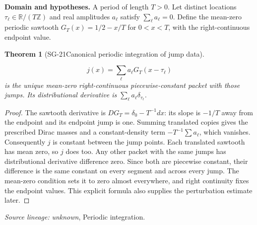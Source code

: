 \documentclass[11pt]{article}
\newtheorem{theorem}{Theorem}[section]
\theoremstyle{definition}\newtheorem{definition}[theorem]{Definition}
\theoremstyle{remark}\newtheorem{remark}[theorem]{Remark}
\begin{document}
\par{\small\textbf{Domain and hypotheses.} A period of length $T>0$. Let distinct locations $\tau_\ell\in\mathbb R/(T\mathbb Z)$ and real amplitudes $a_\ell$ satisfy $\sum_\ell a_\ell=0$. Define the mean-zero periodic sawtooth $G_T(x)=1/2-x/T$ for $0<x<T$, with the right-continuous endpoint value.}\par
\begin{theorem}[SG-21\quad Canonical periodic integration of jump data]\label{SG-21}

\[
 j(x)=\sum_\ell a_\ell G_T(x-\tau_\ell)
\]
is the unique mean-zero right-continuous piecewise-constant packet with those
jumps. Its distributional derivative is $\sum_\ell a_\ell\delta_{\tau_\ell}$.

\end{theorem}
\begin{proof}

The sawtooth derivative is $DG_T=\delta_0-T^{-1}dx$: its slope is $-1/T$
away from the endpoint and its endpoint jump is one. Summing translated
copies gives the prescribed Dirac masses and a constant-density term
$-T^{-1}\sum a_\ell$, which vanishes. Consequently $j$ is constant between
the jump points. Each translated sawtooth has mean zero, so $j$ does too.
Any other packet with the same jumps has distributional derivative difference
zero. Since both are piecewise constant, their difference is the same
constant on every segment and across every jump. The mean-zero condition
sets it to zero almost everywhere, and right continuity fixes the endpoint
values. This explicit formula also supplies the perturbation estimate later.

\end{proof}

\par{\small\color{Teal}\textit{Source lineage:} \textit{unknown}, Periodic integration.}\par
\end{document}
